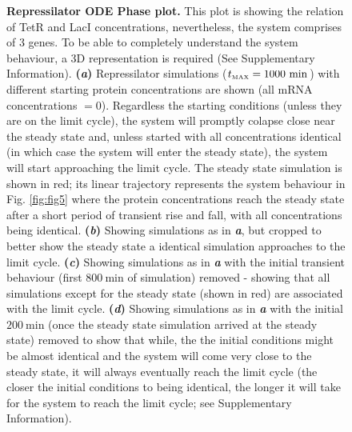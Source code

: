 \documentclass[runningheads,a4paper]{llncs}
\begin{document}
\begin{figure}
    \centering
    \singlespacing
    \noindent{}
    \caption{\textbf{Repressilator ODE Phase plot.} This plot is showing the relation of TetR and LacI concentrations, nevertheless, the system comprises of 3 genes. To be able to completely understand the system behaviour, a 3D representation is required (See Supplementary Information). \textbf{(\textit{a})} Repressilator simulations ($t_{\textrm{\tiny MAX}}=1000\ \textrm{min} $) with different starting protein concentrations are shown (all mRNA concentrations $= 0$). Regardless the starting conditions (unless they are on the limit cycle), the system will promptly colapse close near the steady state and, unless started with all concentrations identical (in which case the system will enter the steady state), the system will start approaching the limit cycle. The steady state simulation is shown in red; its linear trajectory represents the system behaviour in Fig. \ref{fig:fig5} where the protein concentrations reach the steady state after a short period of transient rise and fall, with all concentrations being identical. \textbf{(\textit{b})} Showing simulations as in \textit{\textbf{a}}, but cropped to better show the steady state a identical simulation approaches to the limit cycle. \textbf{(\textit{c})} Showing simulations as in \textit{\textbf{a}} with the initial transient behaviour (first $800\ \textrm{min}$ of simulation) removed - showing that all simulations except for the steady state (shown in red) are associated with the limit cycle. \textbf{(\textit{d})} Showing simulations as in \textit{\textbf{a}} with the initial $200\ \textrm{min}$ (once the steady state simulation arrived at the steady state) removed to show that while, the the initial conditions might be almost identical and the system will come very close to the steady state, it will always eventually reach the limit cycle (the closer the initial conditions to being identical, the longer it will take for the system to reach the limit cycle; see Supplementary Information).}
    \label{fig:fig6}
\end{figure}
\end{document}
